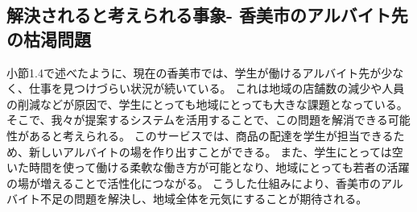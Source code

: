 \subsection{解決されると考えられる事象- 香美市のアルバイト先の枯渇問題}
小節1.4で述べたように、現在の香美市では、学生が働けるアルバイト先が少なく、仕事を見つけづらい状況が続いている。
これは地域の店舗数の減少や人員の削減などが原因で、学生にとっても地域にとっても大きな課題となっている。
そこで、我々が提案するシステムを活用することで、この問題を解消できる可能性があると考えられる。
このサービスでは、商品の配達を学生が担当できるため、新しいアルバイトの場を作り出すことができる。
また、学生にとっては空いた時間を使って働ける柔軟な働き方が可能となり、地域にとっても若者の活躍の場が増えることで活性化につながる。
こうした仕組みにより、香美市のアルバイト不足の問題を解決し、地域全体を元気にすることが期待される。



